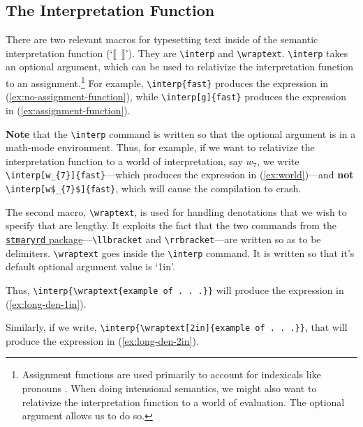 \documentclass{article}
\newcommand{\interp}[2][]{
	\(
		\left\llbracket\,\text{#2}\,\right\rrbracket^{#1}
	\)
	}
\newcommand{\wraptext}[2][1in]{\begin{varwidth}{#1}{\RaggedRight#2}\end{varwidth}}
\begin{document}
\subsection{The Interpretation Function}

There are two relevant macros for typesetting text inside of the semantic interpretation function (`$\llbracket$~$\rrbracket$'). They are \verb|\interp| and \verb|\wraptext|. \verb|\interp| takes an optional argument, which can be used to relativize the interpretation function to an assignment.\footnote{Assignment functions are used primarily to account for indexicals like pronouns \citep[\emph{e.g.},][90--95]{heim1998}. When doing intensional semantics, we might also want to relativize the interpretation function to a world of evaluation. The optional argument allows us to do so.} For example, \verb|\interp{fast}| produces the expression in (\ref{ex:no-assignment-function}), while \verb|\interp[g]{fast}| produces the expression in (\ref{ex:assignment-function}).

\textbf{Note} that the \verb|\interp| command is written so that the optional argument is in a math-mode environment. Thus, for example, if we want to relativize the interpretation function to a world of interpretation, say $w_{7}$, we write \verb|\interp[w_{7}]{fast}|---which produces the expression in (\ref{ex:world})---and \textbf{not} \verb|\interp[w$_{7}$]{fast}|, which will cause the compilation to crash.

\begin{exe}
	\ex{
		\begin{xlist}
			\ex{\interp{fast}}\label{ex:no-assignment-function}
			\ex{\interp[g]{fast}}\label{ex:assignment-function}
			\ex{\interp[w_{7}]{fast}}\label{ex:world}
		\end{xlist}
	}
\end{exe}

The second macro, \verb|\wraptext|, is used for handling denotations that we wish to specify that are lengthy. It exploits the fact that the two commands from the \href{http://ctan.org/pkg/stmaryrd}{\texttt{stmaryrd} package}---\verb|\llbracket| and \verb|\rrbracket|---are written so as to be delimiters. \verb|\wraptext| goes inside the \verb|\interp| command. It is written so that it's default optional argument value is `1in'. 

Thus, \verb|\interp{\wraptext{example of . . .}}| will produce the expression in (\ref{ex:long-den-1in}). 

Similarly, if we write, \verb|\interp{\wraptext[2in]{example of . . .}}|, that will produce the expression in (\ref{ex:long-den-2in}).
\end{document}
